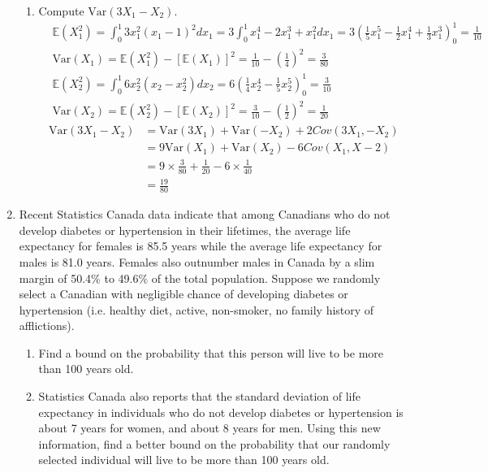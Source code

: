 \documentclass[11pt]{article}
\newcommand{\e}{\mathbb{E}}
\newcommand{\var}{\text{Var}}
\begin{document}
\begin{enumerate}[label=\textbf{Question \arabic*:},start=1]
\begin{enumerate}
	\item Compute $\var(3X_1 - X_2)$.\\
	\begin{align*}
	& \e(X_1^2) = \int_0^1 3 x_1^2 (x_1 - 1)^2 d x_1 = 3 \int_0^1 x_1^4 - 2x_1^3 + x_1^2 dx_1 =  3 (\frac{1}{5}x_1^5 - \frac{1}{2}x_1^4 + \frac{1}{3} x_1^3)_0^1 =  \frac{1}{10} \\
	& \var(X_1) = \e(X_1^2) - [\e(X_1)]^2  = \frac{1}{10} - (\frac{1}{4})^2 = \frac{3}{80} \\
	& \e(X_2^2) = \int_0^1 6 x_2^2 (x_2 - x_2^2) dx_2 = 6 (\frac{1}{4} x_2^4 - \frac{1}{5} x_2^5)_0^1 = \frac{3}{10} \\
	& \var(X_2) = \e(X_2^2) - [\e(X_2)]^2 =  \frac{3}{10} - (\frac{1}{2})^2 = \frac{1}{20} 
	\end{align*}
	\begin{align*}
	\var(3X_1 - X_2) & = \var(3X_1) + \var(-X_2) + 2 Cov(3X_1, -X_2) \\
	& = 9 \var(X_1) + \var(X_2) - 6Cov(X_1, X-2) \\
	& = 9 \times \frac{3}{80} + \frac{1}{20} - 6 \times \frac{1}{40} \\
	& = \frac{19}{80}
	\end{align*}

\end{enumerate}






\item 
Recent Statistics Canada data indicate that among Canadians who do not develop diabetes or hypertension in their lifetimes, the average life expectancy for females is 85.5 years while the average life expectancy for males is 81.0 years. Females also outnumber males in Canada by a slim margin of 50.4\% to 49.6\% of the total population. Suppose we randomly select a Canadian with negligible chance of developing diabetes or hypertension (i.e. healthy diet, active, non-smoker, no family history of afflictions).

\begin{enumerate}
  \item Find a bound on the probability that this person will live to be more than 100 years old.\\

  \item Statistics Canada also reports that the standard deviation of life expectancy in individuals who do not develop diabetes or hypertension is about 7 years for women, and about 8 years for men. Using this new information, find a better bound on the probability that our randomly selected individual will live to be more than 100 years old.\\


\end{enumerate}
\end{enumerate}
\end{document}
